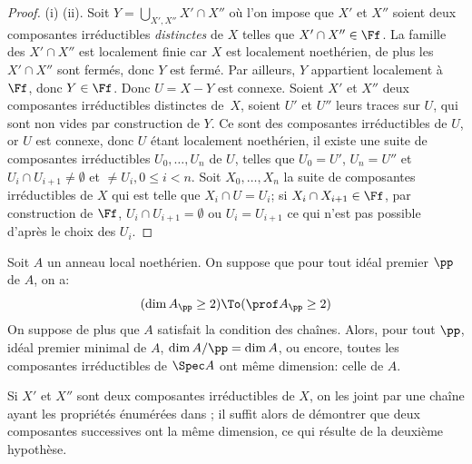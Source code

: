 \begin{proof}
(i) \ALORS (ii). Soit $Y=\bigcup_{X', X''} X'\cap X''$ o\`u l'on impose que $X'$ et $X''$ soient deux composantes irr\'eductibles \emph{distinctes} de $X$ telles que $X'\cap X'' \in \Ff$. La famille des $X'\cap X''$ est localement finie car $X$ est localement noeth\'erien, de plus les $X'\cap X''$ sont ferm\'es, donc $Y$ est ferm\'e. Par ailleurs, $Y$ appartient localement \`a $\Ff$, donc $Y\in \Ff$. Donc $U=X-Y$ est connexe. Soient $X'$ et $X''$ deux composantes irr\'eductibles distinctes de~$X$, soient $U'$ et $U''$ leurs traces sur $U$, qui sont non vides par construction de $Y$. Ce sont des composantes irr\'eductibles de $U$, or $U$ est connexe, donc $U$ \'etant localement noeth\'erien, il existe une suite de composantes irr\'eductibles $U_0, \ldots, U_n$ de $U$, telles que $U_0=U'$, $U_n=U''$ et $U_{i}\cap U_{i+1}\neq \emptyset$ et $\neq U_{i}, 0\leq i < n$. Soit $X_0, \ldots, X_n$ la suite de composantes irr\'eductibles de $X$ qui est telle que $X_{i}\cap U=U_{i}$; si $X_{i}\cap X_{i+1}\in \Ff$, par construction de $\Ff$, $U_{i}\cap U_{i+1}=\emptyset$ ou $U_{i}=U_{i+1}$ ce qui n'est pas possible d'apr\`es le choix des $U_{i}$.
\end{proof}

\begin{corollaire} \label{III.3.9}
Soit $A$ un anneau local noeth\'erien. On suppose que pour tout id\'eal premier $\pp$ de $A$, on a:
\[
(\dim A_\pp \geq 2) \To (\prof A_\pp \geq 2)
\]
On suppose de plus que $A$ satisfait la condition des cha\^ines. Alors, pour tout $\pp$, id\'eal premier minimal de $A$, $\dim A/\pp =\dim A$, ou encore, toutes les composantes irr\'eductibles de $\Spec A$ ont m\^eme dimension: celle de $A$.
\end{corollaire}

Si $X'$ et $X''$ sont deux composantes irr\'eductibles de $X$, on les joint par une cha\^ine ayant les propri\'et\'es \'enum\'er\'ees dans  ; il suffit alors de d\'emontrer que deux composantes successives ont la m\^eme dimension, ce qui r\'esulte de la deuxi\`eme hypoth\`ese.

